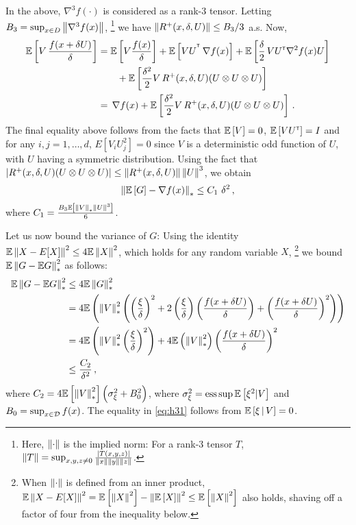 In the above, $\nabla^3 f(\cdot)$ is considered as a rank-3 tensor.
Letting $B_3 = \sup_{x\in D} \left\| \nabla^3 f(x) \right\|$,%
\footnote{Here, $\left\|\cdot\right\|$ is the implied norm: For a rank-3 tensor $T$, $\left\|T\right\| = \sup_{x,y,z\ne 0}
\frac{|T (x,y,z)|}{\left\|x\right\|\left\|y\right\|\left\|z\right\|}$.
}
we have $\left\| R^{+}(x,\delta,U)\right\| \le B_3/3$ a.s.
Now,
\begin{align*}
\mathbb{E}\left[V\, \dfrac{f(x+\delta U)}{\delta}\right]
&= \mathbb{E}\left[V \frac{f(x)}{\delta}\right] +  \mathbb{E}\left[VU^{^\mathsf{\scriptscriptstyle T}}
\, \nabla f(x)\right]  + \mathbb{E}\left[\frac{\delta}{2}\, V U^\mathsf{\scriptscriptstyle T} \nabla^2 f(x) U\right] \\
&\qquad+   \mathbb{E}\left[\frac{\delta^2}{2}  V \,R^{+}(x,\delta,U)(U \otimes U \otimes U)\right]
\\
&= \, \nabla f(x)  + \mathbb{E}\left[\frac{\delta^2}{2}  V \,R^{+}(x,\delta,U)(U \otimes U \otimes U)\right]\,.
\end{align*}
The final equality above follows from the facts that $\mathbb{E}\left[V\right] = 0$, $\mathbb{E}\left[V U^\mathsf{\scriptscriptstyle T}\right] = I$ and for any $i,j=1,\ldots,d$, $E[V_i U_j^2] = 0$ since $V$ is a deterministic odd function of $U$, with $U$ having a symmetric distribution.
Using the fact that $|R^{+}(x,\delta,U) (U \otimes U \otimes U)| \le
\left\|R^{+}(x,\delta,U)\right\| \left\|U\right\|^3$,
we obtain
\begin{align*}
\left\| \mathbb{E}\left[ G \right] - \nabla f(x) \right\|_*
\le C_1\,\, \delta^2 \,,
\end{align*}
where $C_1 = \frac{B_3 \mathbb{E}\left[ \left\|V\right\|_* \left\|U\right\|^3 \right]}{6}$.

Let us now bound the variance of $G$:
Using the identity $\mathbb{E}\left\|X -  E[X]\right\|^2 \le 4 \mathbb{E} \left\|X\right\|^2$, which holds for any random variable $X$,%
\footnote{When $\left\|\cdot\right\|$ is defined from an inner product,
$\mathbb{E}\left\|X -  E[X]\right\|^2 = \mathbb{E}\left[\left\|X\right\|^2\right] - \left\|\mathbb{E}\left[X\right]\right\|^2 \le \mathbb{E}\left[\left\|X\right\|^2\right]$ also holds, shaving off a factor of four from the inequality below.}
we bound $\mathbb{E}\left\| G - \mathbb{E} G\right\|_*^2$ as follows:
\begin{align}
\mathbb{E}\left\| G - \mathbb{E} G\right\|_*^2
 &\le 4 \mathbb{E} \left\|G\right\|_*^2 \nonumber \\
& =  4\mathbb{E}\left( \left\| V \right\|_*^2 \left(\left(\dfrac{\xi}{\delta}\right)^2  + 2 \left(\dfrac{\xi}{\delta}\right) \left(\dfrac{f(x+\delta U)}{\delta}\right)
+ \left( \dfrac{f(x+\delta U) }{\delta} \right)^2 \right)\right) \nonumber \\
&=  4\mathbb{E}\left( \left\| V \right\|_*^2 \left(\dfrac{\xi}{\delta}\right)^2\right)
+ 4 \mathbb{E} \left(\left\| V \right\|_*^2 \right)\left( \dfrac{f(x+\delta U) }{\delta} \right)^2  \label{eq:h31} \\
& \le  \frac{C_2}{\delta^2}\,, \nonumber 
\end{align}
where $C_2 = 4 \mathbb{E}\left[\left\|V\right\|_*^2\right]\left( \sigma_\xi^2+B_0^2\right)$, where
$\sigma_\xi^2 = \operatorname{ess\,sup} \mathbb{E}\left[\xi^2|V\right]$ and $B_0 = \sup_{x\in \mathcal{D}} f(x)$.
The equality in \eqref{eq:h31} follows from $\mathbb{E}\left[ \xi \,|\, V \right] = 0$.

